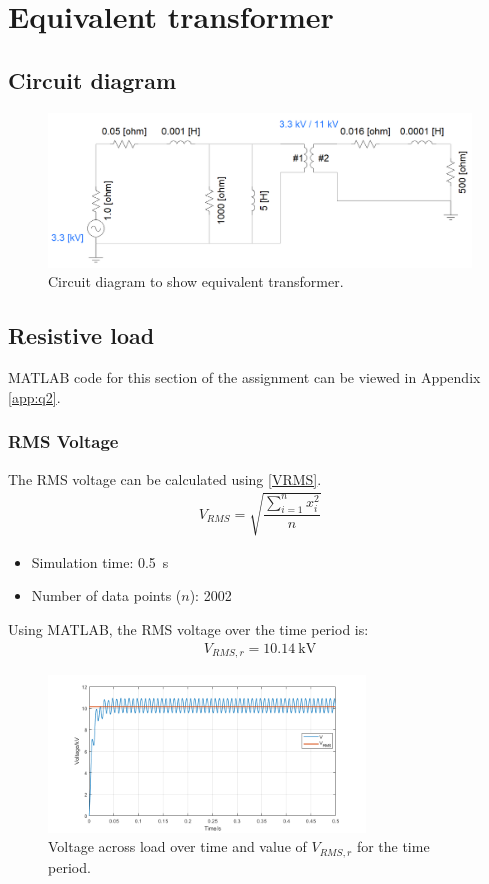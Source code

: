 \section{Equivalent transformer}
\subsection{Circuit diagram}
\begin{figure}[H]
    \centering
    \includegraphics[width = \textwidth]{img/figure5.png}
    \caption{Circuit diagram to show equivalent transformer.}
    \label{fig:transformerCircuit}
\end{figure}
\subsection{Resistive load}
MATLAB code for this section of the assignment can be viewed in Appendix \ref{app:q2}.
\subsubsection{RMS Voltage }
The RMS voltage can be calculated using \eqref{VRMS}.
\begin{gather}\label{VRMS}
    V_{RMS} = \sqrt{\dfrac{\sum_{i=1}^n x_i^2}{n}}
\end{gather}
\begin{itemize}
    \item Simulation time: \SI{0.5}{\second}
    \item Number of data points ($n$): 2002
\end{itemize}
Using MATLAB, the RMS voltage over the time period is:
\begin{gather}
    V_{RMS,r} = \SI{10.14}{\kilo\volt}
\end{gather}
\begin{figure}[H]
    \centering
    \includegraphics[width = 0.75\textwidth]{img/figure8.png}
    \caption{Voltage across load over time and value of $V_{RMS,r}$ for the time period.}
    \label{fig:VRMSResistor}
\end{figure}
